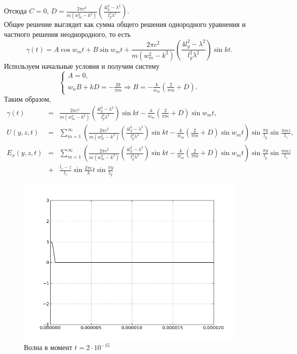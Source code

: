 Отсюда $C = 0$, $D = \frac{2\pi c^2}{m(w_m^2 - k^2)}\left(\frac{4l_y^2 - \lambda^2}{l_y^2\lambda^2} \right)$.\\
Общее решение выглядит как сумма общего решения однородного уравнения и частного решения неоднородного, то есть
\[
\gamma(t) = A\cos{w_mt} + B\sin{w_mt} + \frac{2\pi c^2}{m(w_m^2 - k^2)}\left(\frac{4l_y^2 - \lambda^2}{l_y^2\lambda^2} \right)\sin{kt}.
\]
Используем начальные условия и получим систему
\[
\left\{
  \begin{array}{l}
    A = 0,\\
    w_nB + kD = -\frac{2k}{\pi m} \Rightarrow B = -\frac{k}{w_m}\left(\frac{2}{\pi m} + D \right).
  \end{array}
\right.
\]
Таким образом,
\begin{eqnarray*}
  \gamma(t) &=& \frac{2\pi c^2}{m(w_m^2 - k^2)}\left(\frac{4l_y^2 - \lambda^2}{l_y^2\lambda^2} \right)\sin{kt} - \frac{k}{w_m}\left(\frac{2}{\pi m} + D\right)\sin{w_mt},\\
  U(y, z, t) &=& \displaystyle \sum_{m=1}^{\infty} \left( \frac{2\pi c^2}{m(w_m^2 - k^2)}\left(\frac{4l_y^2 - \lambda^2}{l_y^2\lambda^2} \right)\sin{kt} - \frac{k}{w_m}\left(\frac{2}{\pi m} + D\right)\sin{w_mt} \right) \sin\frac{\pi y}{l_y} \sin\frac{\pi m z}{l_z},\\
  E_x(y, z, t) &=& \displaystyle
    \sum_{m=1}^{\infty} \left( \frac{2\pi c^2}{m(w_m^2 - k^2)}\left(\frac{4l_y^2 - \lambda^2}{l_y^2\lambda^2} \right)\sin{kt} - \frac{k}{w_m}\left(\frac{2}{\pi m} + D\right)\sin{w_mt} \right) \sin\frac{\pi y}{l_y} \sin\frac{\pi m z}{l_z}\\
    &+& \frac{l_z - z}{l_z} \sin\frac{2\pi c}{\lambda}t \sin\frac{\pi y}{l_y}
\end{eqnarray*}

\begin{figure}[!hbtp]
  \center
  \includegraphics[width=0.9\linewidth]{first}
  \caption{Волна в момент $t = 2\cdot10^{-15}$}
\end{figure}


